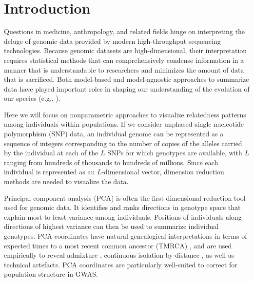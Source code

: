 \section{Introduction}
Questions in medicine, anthropology, and related fields hinge on interpreting the deluge of genomic data provided by modern high-throughput sequencing technologies. Because genomic datasets are high-dimensional, their interpretation requires statistical methods that can comprehensively condense information in a manner that is understandable to researchers and minimizes the amount of data that is sacrificed. Both model-based and model-agnostic approaches to summarize data have played important roles in shaping our understanding of the evolution of our species (e.g., \citep{lawson2012inference, novembre2016recent, spence2018inference, eigen2006, Hellenthal747}).

Here we will focus on nonparametric approaches to visualize relatedness patterns among individuals within populations. If we consider unphased single nucleotide polymorphism (SNP) data, an individual genome can be represented as a sequence of integers corresponding to the number of copies of the alleles carried by the individual at each of the $L$ SNPs for which genotypes are available, with $L$ ranging from hundreds of thousands to hundreds of millions. Since each individual is represented as an $L$-dimensional vector, dimension reduction methods are needed to visualize the data.

Principal component analysis (PCA) is often the first dimensional reduction tool used for genomic data. It identifies and ranks directions in genotype space that explain most-to-least variance among individuals. Positions of individuals along directions of highest variance can then be used to summarize individual genotypes. PCA coordinates have natural genealogical interpretations in terms of expected times to a most recent common ancestor (TMRCA) \citep{mcvean2009genealogical}, and are used empirically to reveal admixture \citep{brisbin2012pcadmix}, continuous isolation-by-distance \citep{novembre2008europe, nelson2008population}, as well as technical artefacts. PCA coordinates are particularly well-suited to correct for population structure in GWAS\citep{eigen2006}.

